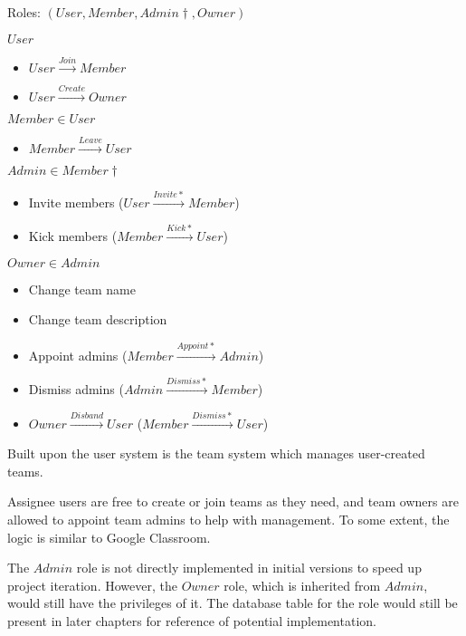 Roles: $(User, Member, Admin\dagger{}, Owner)$

$User$
\begin{itemize}
	\item $User\xrightarrow{Join}Member$

	\item $User\xrightarrow{Create}Owner$
\end{itemize}

$Member\in{}User$
\begin{itemize}
	\item $Member\xrightarrow{Leave}User$
\end{itemize}

$Admin\in{}Member\dagger{}$
\begin{itemize}
	\item Invite members ($User\xrightarrow{Invite*}Member$)

	\item Kick members ($Member\xrightarrow{Kick*}User$)
\end{itemize}

$Owner\in{}Admin$
\begin{itemize}
	\item Change team name

	\item Change team description

	\item Appoint admins ($Member\xrightarrow{Appoint*}Admin$) \textdagger{}

	\item Dismiss admins ($Admin\xrightarrow{Dismiss*}Member$) \textdagger{}

	\item $Owner\xrightarrow{Disband}User$ ($Member\xrightarrow{Dismiss*}User$)
\end{itemize}

Built upon the user system is the team system which manages user-created teams.

Assignee users are free to create or join teams as they need, and team owners
are allowed to appoint team admins to help with management. To some extent, the
logic is similar to Google Classroom.

\textdagger{} The $Admin$ role is not directly implemented in initial versions to
speed up project iteration. However, the $Owner$ role, which is inherited from
$Admin$, would still have the privileges of it. The database table for the role
would still be present in later chapters for reference of potential
implementation.

